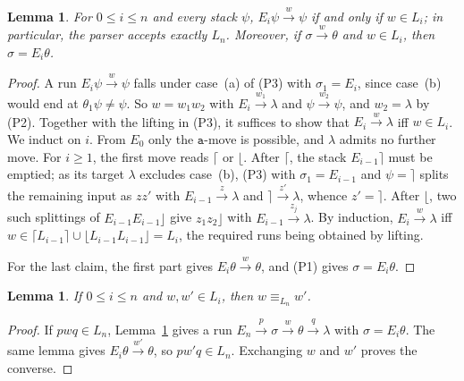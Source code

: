 \documentclass[11pt,a4paper]{article}
\newtheorem{lemma}[theorem]{Lemma}
\theoremstyle{remark}
\theoremstyle{plain}
\begin{document}
\begin{lemma}\label{lem:app-recognition}
For $0\le i\le n$ and every stack $\psi$,
$E_i\psi\xrightarrow{w}\psi$ if and only if $w\in L_i$; in particular,
the parser accepts exactly $L_n$. Moreover, if
$\sigma\xrightarrow{w}\theta$ and $w\in L_i$, then $\sigma=E_i\theta$.
\end{lemma}
\begin{proof}
A run $E_i\psi\xrightarrow{w}\psi$ falls under case~(a) of (P3) with
$\sigma_1=E_i$, since case~(b) would end at $\theta_1\psi\ne\psi$. So
$w=w_1w_2$ with $E_i\xrightarrow{w_1}\lambda$ and
$\psi\xrightarrow{w_2}\psi$, and $w_2=\lambda$ by (P2). Together with
the lifting in (P3), it suffices to show that $E_i\xrightarrow{w}\lambda$
iff $w\in L_i$. We induct on $i$. From $E_0$ only the $\mathtt a$-move
is possible, and $\lambda$ admits no further move. For $i\ge1$, the
first move reads $\lceil$ or $\lfloor$. After $\lceil$, the stack
$E_{i-1}\rceil$ must be emptied; as its target $\lambda$ excludes
case~(b), (P3) with $\sigma_1=E_{i-1}$ and $\psi=\rceil$ splits the
remaining input as $zz'$ with $E_{i-1}\xrightarrow{z}\lambda$ and
$\rceil\xrightarrow{z'}\lambda$, whence $z'=\rceil$. After $\lfloor$,
two such splittings of $E_{i-1}E_{i-1}\rfloor$ give
$z_1z_2\rfloor$ with $E_{i-1}\xrightarrow{z_j}\lambda$. By induction,
$E_i\xrightarrow{w}\lambda$ iff
$w\in\lceil{}L_{i-1}\rceil\cup\lfloor{}L_{i-1}L_{i-1}\rfloor=L_i$, the
required runs being obtained by lifting.

For the last claim, the first part gives
$E_i\theta\xrightarrow{w}\theta$, and (P1) gives $\sigma=E_i\theta$.
\end{proof}

\begin{lemma}\label{lem:app-complete-subtree-exchange}
If $0\le i\le n$ and $w,w'\in L_i$, then $w\equiv_{L_n}w'$.
\end{lemma}
\begin{proof}
If $pwq\in L_n$, Lemma~\ref{lem:app-recognition} gives a run
$E_n\xrightarrow{p}\sigma\xrightarrow{w}\theta\xrightarrow{q}\lambda$
with $\sigma=E_i\theta$. The same lemma gives
$E_i\theta\xrightarrow{w'}\theta$, so $pw'q\in L_n$. Exchanging
$w$ and $w'$ proves the converse.
\end{proof}
\end{document}
